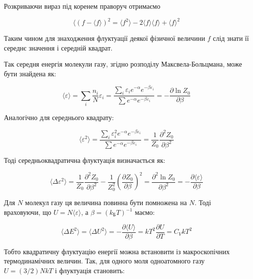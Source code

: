 Розкриваючи вираз під коренем праворуч отримаємо

\begin{equation}
	\langle (f  - \langle f \rangle)^2 = \langle f^2 \rangle - 2 \langle f \rangle\langle f \rangle + \langle f \rangle^2
	\label{eq:150.2}
\end{equation}

Таким чином для знаходження флуктуації деякої фізичної величини $f$ слід знати її середнє значення і середній квадрат.

Так середня енергія молекули газу, згідно розподілу Максвела-Больцмана, може бути знайдена як:

\begin{equation}
	\langle \varepsilon \rangle = \sum_i \frac{n_i}{N} \varepsilon_i
	= \frac{\sum_i \varepsilon_i e^{-\alpha} e^{-\beta \varepsilon_i}}{\sum e^{-\alpha} e^{-\beta \varepsilon_i}}
	= -\frac{\partial \ln Z_0}{\partial \beta}
	\label{eq:150.3}
\end{equation}

Аналогічно для середнього квадрату:

\begin{equation}
	\langle \varepsilon^2 \rangle = \frac{\sum_i \varepsilon_i^2 e^{-\alpha} e^{-\beta \varepsilon_i}}{\sum e^{-\alpha} e^{-\beta \varepsilon_i}}
	= \frac{1}{Z_0} \frac{\partial^2 Z_0}{\partial \beta^2}
	\label{eq:150.4}
\end{equation}

Тоді середньоквадратична флуктуація визначається як:

\begin{equation}
	\langle \Delta \varepsilon^2 \rangle = \frac{1}{Z_0} \frac{\partial^2 Z_0}{\partial \beta^2} - \frac{1}{Z_0^2} \left( \frac{\partial Z_0}{\partial \beta} \right)^2
	= \frac{\partial^2 \ln Z_0}{\partial \beta^2}
	= -\frac{\partial \langle \varepsilon \rangle}{\partial \beta}
	\label{eq:150.5}
\end{equation}

Для $N$ молекул газу ця величина повинна бути помножена на $N$. Тоді враховуючи, що $U = N \langle \varepsilon \rangle$, а $\beta = (k_\text{Б} T)^{-1}$ маємо:

\begin{equation}
	\langle \Delta E^2 \rangle = \langle \Delta U^2 \rangle = - \frac{\partial \langle U \rangle}{\partial \beta} = kT^2 \frac{\partial U}{\partial T} = C_V kT^2
	\label{eq:150.6}
\end{equation}

Тобто квадратичну флуктуацію енергії можна встановити із макроскопічних термодинамічних величин. Так, для одного моля одноатомного газу $U = (3/2) N k T$ і флуктуація становить:

